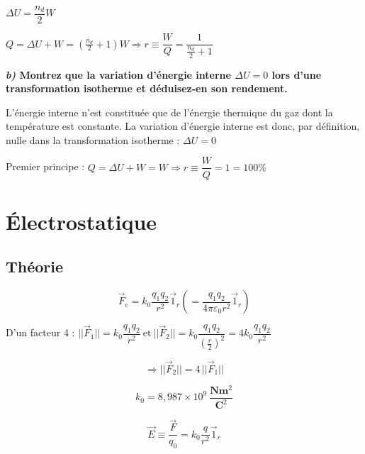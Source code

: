 \documentclass	[11pt, a4paper, openany]{book}
\begin{document}
		$ \Delta U = \dfrac{n_d}{2}W$
		
		$Q = \Delta U + W = (\frac{n_d}{2}+1)W \Rightarrow r \equiv \dfrac{W}{Q} = \dfrac{1}{\frac{n_d}{2}+1}$
		
	\textbf{\textit{b)} Montrez que la variation d'énergie interne $\Delta U = 0$ lors d'une transformation isotherme et déduisez-en son rendement.}
		
		L'énergie interne n'est constituée que de l'énergie thermique du gaz dont la température est constante. La variation d'énergie interne est donc, par définition, nulle dans la transformation isotherme : $\Delta U = 0$
		
		Premier principe : $Q = \Delta U + W = W \Rightarrow r \equiv \dfrac{W}{Q} = 1 = 100\% $
		

\newpage
\section{Électrostatique}
	\subsection{Théorie}
	
	$$ \vec F_e = k_0 \dfrac{q_1 q_2}{r^2} \vec 1_r \left(= \dfrac{q_1 q_2}{4\pi \varepsilon_0 r^2} \vec 1_r \right) $$
	
	
	D'un facteur 4 : $ ||\vec F_1|| = k_0 \dfrac{q_1 q_2}{r^2}\ \text{et}\ ||\vec F_2|| = k_0 \dfrac{q_1 q_2}{(\frac{r}{2})^2} = 4 k_0 \dfrac{q_1 q_2}{r^2}$
	
	$$\Rightarrow ||\vec F_2|| = 4\,||\vec F_1||$$
	
	
	$$ k_0 = 8,987 \times 10^9\ \frac{\textbf{N} \textbf{m}^2}{\textbf{C}^2} $$
	
	
	$$ \vec E \equiv \dfrac{\vec F}{q_0} = k_0 \dfrac{q}{r^2} \vec 1_r $$
	
	
\end{document}
